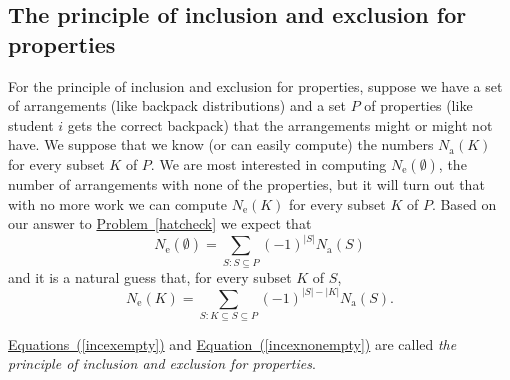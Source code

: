 \documentclass[10pt,]{book}
\theoremstyle{plain}
\theoremstyle{definition}
\numberwithin{equation}{chapter}
\begin{document}
\subsection[{The principle of inclusion and exclusion for properties}]{The principle of inclusion and exclusion for properties}\label{subsection-54}
For the principle of inclusion and exclusion for properties, suppose we have a set of arrangements (like backpack distributions) and a set \(P\) of properties (like student \(i\) gets the correct backpack) that the arrangements might or might not have. We suppose that we know (or can easily compute) the numbers \(N_{\mbox{a} }(K)\) for every subset \(K\) of \(P\). We are most interested in computing \(N_{\mbox{e} }(\emptyset)\), the number of arrangements with none of the properties, but it will turn out that with no more work we can compute \(N_{\mbox{e} }(K)\) for every subset \(K\) of \(P\). Based on our answer to \hyperref[hatcheck]{Problem~\ref{hatcheck}} we expect that%
\begin{equation}
N_{\mbox{e} }(\emptyset) = \sum_{S: S\subseteq P} (-1)^{|S|}N_{\mbox{a} }(S)\label{incexempty}
\end{equation}
and it is a natural guess that, for every subset \(K\) of \(S\),%
\begin{equation}
N_{\mbox{e} }(K) = \sum_{S: K\subseteq S\subseteq P}
(-1)^{|S|-|K|}N_{\mbox{a} }(S).\label{incexnonempty}
\end{equation}
%
\par
\hyperref[incexempty]{Equations~(\ref{incexempty})} and \hyperref[incexnonempty]{Equation~(\ref{incexnonempty})} are called \emph{the principle of inclusion and exclusion for properties}.%
\end{document}
